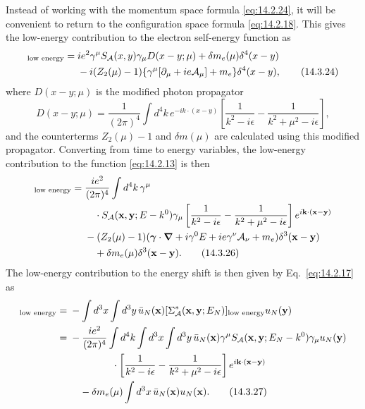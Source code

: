 Instead of working with the momentum space formula \eqref{eq:14.2.24}, it will
be convenient to return to the configuration space formula
\eqref{eq:14.2.18}. This gives the low-energy contribution to the electron
self-energy function as
\begin{align}
[\Sigma_{\mathcal A}^*(x,y)]_{\text{low energy}}
={}&ie^2\gamma^\mu S_{\mathcal A}(x,y)\gamma_\mu D(x-y;\mu)
+\delta m_e(\mu)\delta^4(x-y)\notag\\
&-i(Z_2(\mu)-1)\{\gamma^\mu[\partial_\mu+ie\mathcal A_\mu]+m_e\}
\delta^4(x-y),
\tag{14.3.24}\label{eq:14.3.24}
\end{align}
where $D(x-y;\mu)$ is the modified photon propagator
\begin{equation}
D(x-y;\mu)=\frac{1}{(2\pi)^4}\int d^4k\,e^{-ik\cdot(x-y)}
\left[\frac{1}{k^2-i\epsilon}-\frac{1}{k^2+\mu^2-i\epsilon}\right],
\tag{14.3.25}\label{eq:14.3.25}
\end{equation}
and the counterterms $Z_2(\mu)-1$ and $\delta m(\mu)$ are calculated using this
modified propagator. Converting from time to energy variables, the low-energy
contribution to the function \eqref{eq:14.2.13} is then
\begin{align}
[\Sigma_{\mathcal A}^*(\mathbf x,\mathbf y;E)]_{\text{low energy}}
={}&\frac{ie^2}{(2\pi)^4}\int d^4k\,\gamma^\mu
\notag\\
&\quad\cdot S_{\mathcal A}(\mathbf x,\mathbf y;E-k^0)\gamma_\mu
\left[\frac{1}{k^2-i\epsilon}-\frac{1}{k^2+\mu^2-i\epsilon}\right]
e^{i\mathbf k\cdot(\mathbf x-\mathbf y)}\notag\\
&-(Z_2(\mu)-1)(\boldsymbol\gamma\cdot\boldsymbol\nabla
+i\gamma^0E+ie\gamma^\nu\mathcal A_\nu+m_e)
\delta^3(\mathbf x-\mathbf y)\notag\\
&\quad+\delta m_e(\mu)\delta^3(\mathbf x-\mathbf y).
\tag{14.3.26}\label{eq:14.3.26}
\end{align}
The low-energy contribution to the energy shift is then given by
Eq.~\eqref{eq:14.2.17} as
\begin{align}
[\delta E_N]_{\text{low energy}}
={}&-\int d^3x\int d^3y\,\bar u_N(\mathbf x)
[\Sigma_{\mathcal A}^*(\mathbf x,\mathbf y;E_N)]_{\text{low energy}}
u_N(\mathbf y)\notag\\
={}&-\frac{ie^2}{(2\pi)^4}\int d^4k\int d^3x\int d^3y\,
\bar u_N(\mathbf x)\gamma^\mu
S_{\mathcal A}(\mathbf x,\mathbf y;E_N-k^0)\gamma_\mu u_N(\mathbf y)
\notag\\
&\hspace{15mm}\cdot
\left[\frac{1}{k^2-i\epsilon}-\frac{1}{k^2+\mu^2-i\epsilon}\right]
e^{i\mathbf k\cdot(\mathbf x-\mathbf y)}\notag\\
&\quad-\delta m_e(\mu)\int d^3x\,\bar u_N(\mathbf x)u_N(\mathbf x).
\tag{14.3.27}\label{eq:14.3.27}
\end{align}
